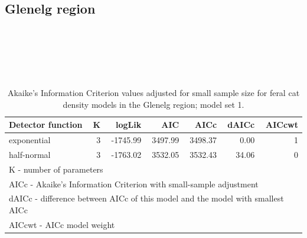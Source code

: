 \documentclass[11pt,a4paper,titlepage,twoside,openright]{style/unimelbthesis}
\begin{document}
\begin{mainmatter}
\hypertarget{glenelg-region-5}{%
\subsection{Glenelg region}\label{glenelg-region-5}}

\(~\)

\(~\)

\(~\)

\begingroup\fontsize{10}{12}\selectfont
\begin{longtable}[t]{lrrrrrr}
\caption{\label{tab:density-aic-g-1}Akaike's Information Criterion values adjusted for small sample size for feral cat density models in the Glenelg region; model set 1.}\\
\toprule
Detector function & K & logLik & AIC & AICc & dAICc & AICcwt\\
\midrule
exponential & 3 & -1745.99 & 3497.99 & 3498.37 & 0.00 & 1\\
half-normal & 3 & -1763.02 & 3532.05 & 3532.43 & 34.06 & 0\\
\bottomrule
\multicolumn{7}{l}{\rule{0pt}{1em}K - number of parameters}\\
\multicolumn{7}{l}{\rule{0pt}{1em}AICc - Akaike's Information Criterion with small-sample adjustment}\\
\multicolumn{7}{l}{\rule{0pt}{1em}dAICc - difference between AICc of this model and the model with smallest AICc}\\
\multicolumn{7}{l}{\rule{0pt}{1em}AICcwt - AICc model weight}\\
\end{longtable}
\endgroup{}

\newpage

\(~\)

\(~\)

\(~\)


\end{mainmatter}
\end{document}
